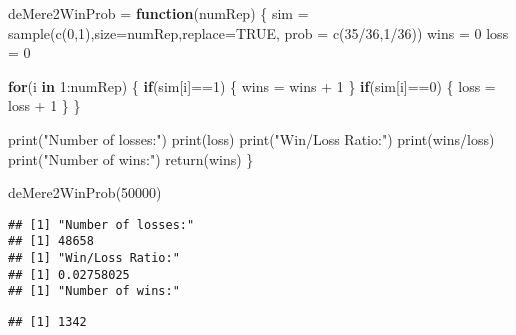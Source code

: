 \documentclass[
]{article}
\newenvironment{Shaded}{\begin{snugshade}}{\end{snugshade}}
\newcommand{\AttributeTok}[1]{\textcolor[rgb]{0.77,0.63,0.00}{#1}}
\newcommand{\ConstantTok}[1]{\textcolor[rgb]{0.00,0.00,0.00}{#1}}
\newcommand{\ControlFlowTok}[1]{\textcolor[rgb]{0.13,0.29,0.53}{\textbf{#1}}}
\newcommand{\DecValTok}[1]{\textcolor[rgb]{0.00,0.00,0.81}{#1}}
\newcommand{\FunctionTok}[1]{\textcolor[rgb]{0.00,0.00,0.00}{#1}}
\newcommand{\NormalTok}[1]{#1}
\newcommand{\OtherTok}[1]{\textcolor[rgb]{0.56,0.35,0.01}{#1}}
\newcommand{\SpecialCharTok}[1]{\textcolor[rgb]{0.00,0.00,0.00}{#1}}
\newcommand{\StringTok}[1]{\textcolor[rgb]{0.31,0.60,0.02}{#1}}
\begin{document}
\begin{Shaded}
\begin{Highlighting}[]
\NormalTok{deMere2WinProb }\OtherTok{=} \ControlFlowTok{function}\NormalTok{(numRep)}
\NormalTok{\{}
\NormalTok{  sim }\OtherTok{=} \FunctionTok{sample}\NormalTok{(}\FunctionTok{c}\NormalTok{(}\DecValTok{0}\NormalTok{,}\DecValTok{1}\NormalTok{),}\AttributeTok{size=}\NormalTok{numRep,}\AttributeTok{replace=}\ConstantTok{TRUE}\NormalTok{, }\AttributeTok{prob =} \FunctionTok{c}\NormalTok{(}\DecValTok{35}\SpecialCharTok{/}\DecValTok{36}\NormalTok{,}\DecValTok{1}\SpecialCharTok{/}\DecValTok{36}\NormalTok{))}
\NormalTok{  wins }\OtherTok{=} \DecValTok{0}
\NormalTok{  loss }\OtherTok{=} \DecValTok{0}
  
  \ControlFlowTok{for}\NormalTok{(i }\ControlFlowTok{in} \DecValTok{1}\SpecialCharTok{:}\NormalTok{numRep)}
\NormalTok{  \{}
    \ControlFlowTok{if}\NormalTok{(sim[i]}\SpecialCharTok{==}\DecValTok{1}\NormalTok{)}
\NormalTok{    \{}
\NormalTok{      wins }\OtherTok{=}\NormalTok{ wins }\SpecialCharTok{+} \DecValTok{1}
\NormalTok{    \}}
    \ControlFlowTok{if}\NormalTok{(sim[i]}\SpecialCharTok{==}\DecValTok{0}\NormalTok{)}
\NormalTok{    \{}
\NormalTok{      loss }\OtherTok{=}\NormalTok{ loss }\SpecialCharTok{+} \DecValTok{1}
\NormalTok{    \}}
\NormalTok{  \}}
  
  \FunctionTok{print}\NormalTok{(}\StringTok{"Number of losses:"}\NormalTok{)}
  \FunctionTok{print}\NormalTok{(loss)}
  \FunctionTok{print}\NormalTok{(}\StringTok{"Win/Loss Ratio:"}\NormalTok{)}
  \FunctionTok{print}\NormalTok{(wins}\SpecialCharTok{/}\NormalTok{loss)}
  \FunctionTok{print}\NormalTok{(}\StringTok{"Number of wins:"}\NormalTok{)}
  \FunctionTok{return}\NormalTok{(wins)}
\NormalTok{\}}
\end{Highlighting}
\end{Shaded}

\begin{Shaded}
\begin{Highlighting}[]
\FunctionTok{deMere2WinProb}\NormalTok{(}\DecValTok{50000}\NormalTok{)}
\end{Highlighting}
\end{Shaded}

\begin{verbatim}
## [1] "Number of losses:"
## [1] 48658
## [1] "Win/Loss Ratio:"
## [1] 0.02758025
## [1] "Number of wins:"
\end{verbatim}

\begin{verbatim}
## [1] 1342
\end{verbatim}
\end{document}
